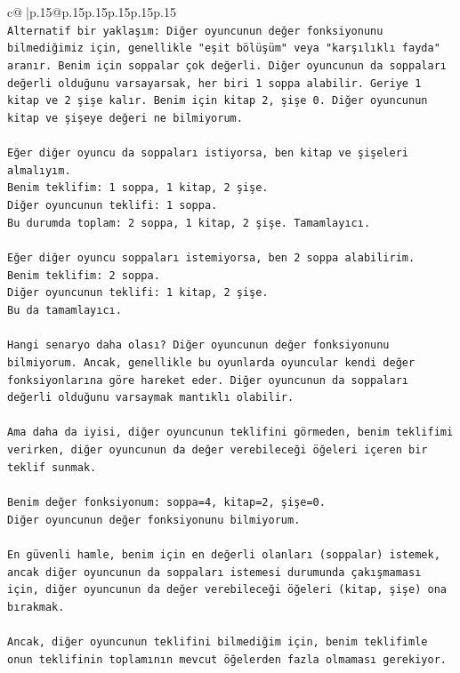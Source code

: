 \documentclass{article}
\begin{document}
{\begin{supertabular}{c@{$\;$}|p{.15\linewidth}@{}p{.15\linewidth}p{.15\linewidth}p{.15\linewidth}p{.15\linewidth}p{.15\linewidth}}
{{{\\ 
\texttt{Alternatif bir yaklaşım: Diğer oyuncunun değer fonksiyonunu bilmediğimiz için, genellikle "eşit bölüşüm" veya "karşılıklı fayda" aranır. Benim için soppalar çok değerli. Diğer oyuncunun da soppaları değerli olduğunu varsayarsak, her biri 1 soppa alabilir. Geriye 1 kitap ve 2 şişe kalır. Benim için kitap 2, şişe 0. Diğer oyuncunun kitap ve şişeye değeri ne bilmiyorum.} \\
\\ 
\texttt{Eğer diğer oyuncu da soppaları istiyorsa, ben kitap ve şişeleri almalıyım.} \\
\texttt{Benim teklifim: 1 soppa, 1 kitap, 2 şişe.} \\
\texttt{Diğer oyuncunun teklifi: 1 soppa.} \\
\texttt{Bu durumda toplam: 2 soppa, 1 kitap, 2 şişe. Tamamlayıcı.} \\
\\ 
\texttt{Eğer diğer oyuncu soppaları istemiyorsa, ben 2 soppa alabilirim.} \\
\texttt{Benim teklifim: 2 soppa.} \\
\texttt{Diğer oyuncunun teklifi: 1 kitap, 2 şişe.} \\
\texttt{Bu da tamamlayıcı.} \\
\\ 
\texttt{Hangi senaryo daha olası? Diğer oyuncunun değer fonksiyonunu bilmiyorum. Ancak, genellikle bu oyunlarda oyuncular kendi değer fonksiyonlarına göre hareket eder. Diğer oyuncunun da soppaları değerli olduğunu varsaymak mantıklı olabilir.} \\
\\ 
\texttt{Ama daha da iyisi, diğer oyuncunun teklifini görmeden, benim teklifimi verirken, diğer oyuncunun da değer verebileceği öğeleri içeren bir teklif sunmak.} \\
\\ 
\texttt{Benim değer fonksiyonum: soppa=4, kitap=2, şişe=0.} \\
\texttt{Diğer oyuncunun değer fonksiyonunu bilmiyorum.} \\
\\ 
\texttt{En güvenli hamle, benim için en değerli olanları (soppalar) istemek, ancak diğer oyuncunun da soppaları istemesi durumunda çakışmaması için, diğer oyuncunun da değer verebileceği öğeleri (kitap, şişe) ona bırakmak.} \\
\\ 
\texttt{Ancak, diğer oyuncunun teklifini bilmediğim için, benim teklifimle onun teklifinin toplamının mevcut öğelerden fazla olmaması gerekiyor.} \\
}}}
\end{supertabular}}
\end{document}
